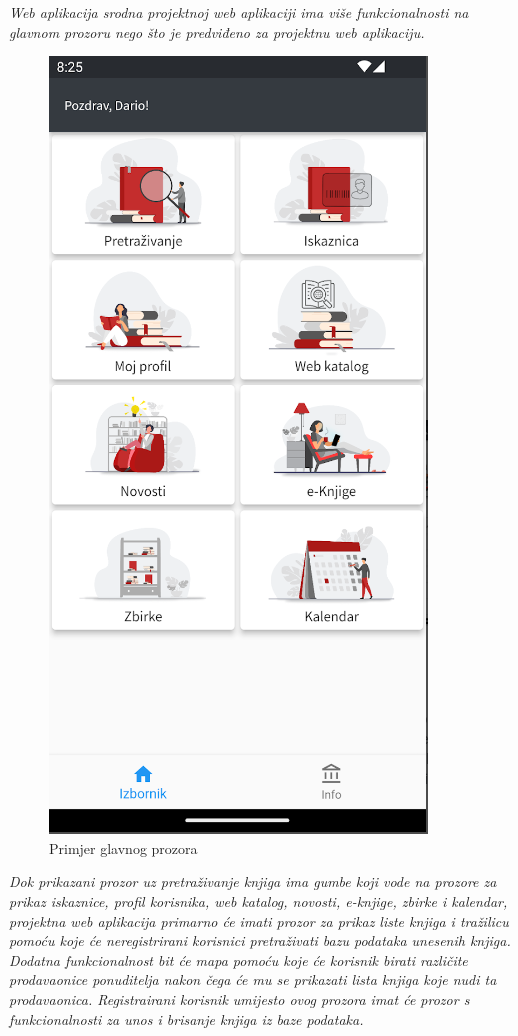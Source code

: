 	\textit{Web aplikacija srodna projektnoj web aplikaciji ima više funkcionalnosti na glavnom prozoru nego što je predviđeno za projektnu web aplikaciju.}

	\begin{figure}[H]
		\includegraphics[scale=0.4]{slike/MainScreen.PNG} %
		\centering
		\caption{Primjer glavnog prozora}
		\label{fig:glavni prozor}
	\end{figure}	
	
	\textit{Dok prikazani prozor uz pretraživanje knjiga ima gumbe koji vode na prozore za prikaz iskaznice, profil korisnika, web katalog, novosti, e-knjige, zbirke i kalendar, projektna web aplikacija primarno će imati prozor za prikaz liste knjiga i tražilicu pomoću koje će neregistrirani korisnici pretraživati bazu podataka unesenih knjiga. Dodatna funkcionalnost bit će mapa pomoću koje će korisnik birati različite prodavaonice ponuditelja nakon čega će mu se prikazati lista knjiga koje nudi ta prodavaonica. Registrairani korisnik umijesto ovog prozora imat će prozor s funkcionalnosti za unos i brisanje knjiga iz baze podataka.}
	
